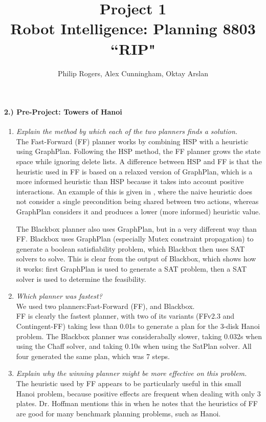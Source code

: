 \documentclass{article}
\begin{document}
\title{Project 1\\{\large{Robot Intelligence: Planning 8803 \textbf{``RIP"}}}}
\author{Philip Rogers, Alex Cunningham, Oktay Arslan}
\maketitle

\paragraph{2.) Pre-Project: Towers of Hanoi}
\begin{enumerate}
\item{\textit{Explain the method by which each of the two planners finds a solution.\\}}
The Fast-Forward (FF) planner works by combining HSP with a heuristic using GraphPlan. Following the HSP method, the FF planner grows the state space while ignoring delete lists.  A difference between HSP and FF is that the heuristic used in FF is based on a relaxed version of GraphPlan, which is a more informed heuristic than HSP because it takes into account positive interactions.  An example of this is given in \cite{hoffmann2001fast}, where the naive heuristic does not consider a single precondition being shared between two actions, whereas GraphPlan considers it and produces a lower (more informed) heuristic value.


The Blackbox planner also uses GraphPlan, but in a very different way than FF.  Blackbox uses GraphPlan (especially Mutex constraint propagation) to generate a boolean satisfiability problem, which Blackbox then uses SAT solvers to solve.  This is clear from the output of Blackbox, which shows how it works: first GraphPlan is used to generate a SAT problem, then a SAT solver is used to determine the feasibility.

\item{\textit{Which planner was fastest?\\}}
We used two planners:Fast-Forward (FF), and Blackbox.\\
FF is clearly the fastest planner, with two of its variants (FFv2.3 and Contingent-FF) taking less than 0.01s to generate a plan for the 3-disk Hanoi problem.  The Blackbox planner was considerabally slower, taking 0.032s when using the Chaff solver, and taking 0.10s when using the SatPlan solver.  All four generated the same plan, which was 7 steps.

\item{\textit{Explain why the winning planner might be more effective on this problem.\\}}
The heuristic used by FF appears to be particularly useful in this small Hanoi problem, because positive effects are frequent when dealing with only 3 plates.  Dr. Hoffman mentions this in \cite{hoffmann2001fast} when he notes that the heuristics of FF are good for many benchmark planning problems, such as Hanoi.  
\end{enumerate}
\end{document}
